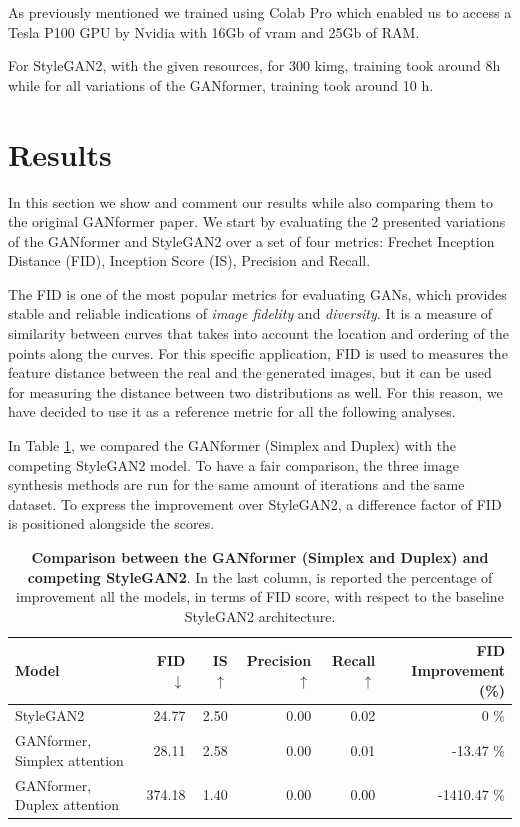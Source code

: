 \documentclass{article}
\begin{document}
	As previously mentioned we trained using Colab Pro which enabled us to access a Tesla P100 GPU 
	by Nvidia with 16Gb of vram 
	and 25Gb of RAM.
	
	For StyleGAN2, with the given resources, for 300 kimg, training took around 8h while for all 
	variations of the GANformer, training took around 10 h.
	
	
	\section{Results}
	In this section we show and comment our results while also comparing them to the original 
	GANformer paper.
	We start by evaluating the 2 presented variations of the GANformer and StyleGAN2 over a set of 
	four metrics: Frechet Inception Distance (FID), Inception Score (IS), Precision and Recall.
	
	The FID is one of the most popular metrics for evaluating GANs, which provides stable and reliable 
	indications of \textit{image fidelity} and \textit{diversity}. 
	It is a measure of similarity between curves that takes into account the location and ordering of the 
	points along the curves. 
	For this specific application, FID is used to measures the feature distance between the real and the 
	generated images, but it can be used for measuring the distance between two distributions as well.
	For this reason, we have decided to use it as a reference metric for all the following analyses.
	
	In Table \ref{tab:our-results}, we compared the GANformer (Simplex and Duplex) with the competing 
	StyleGAN2 model. To have a fair comparison, the three image synthesis methods are run for the 
	same amount of iterations and the same dataset.
	To express the improvement over StyleGAN2, a difference factor of FID is positioned alongside the 
	scores.
	\begin{table}[htb]
		\centering
		\caption{\textbf{Comparison between the GANformer (Simplex and Duplex) and competing 
				StyleGAN2}. In the last column, is reported the percentage of improvement all the models, in 
				terms 
			of FID score, with respect to the baseline StyleGAN2 architecture.}
		\label{tab:our-results}
		\vspace{3mm}
		\small
		\begin{tabular}{l|rrrrr}
			\toprule
			Model                        & FID $\downarrow$  & IS $\uparrow$& Precision$\uparrow$  & Recall 
			$\uparrow$& FID Improvement (\%)\\ 
			\midrule
			StyleGAN2                    &  24.77 & 2.50 & 0.00 & 0.02 & 0 \%\\ 
			GANformer, Simplex attention & 28.11 & 2.58 & 0.00 & 0.01 & -13.47 \%\\ 
			GANformer, Duplex attention  & 374.18 & 1.40 & 0.00 & 0.00 & -1410.47 \% \\ 
			\bottomrule
		\end{tabular}
	\end{table}
	
\end{document}
